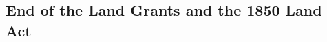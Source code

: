 \documentclass[11pt]{article}
\begin{document}








\subsection{End of the Land Grants and the 1850 Land Act}
\end{document}
